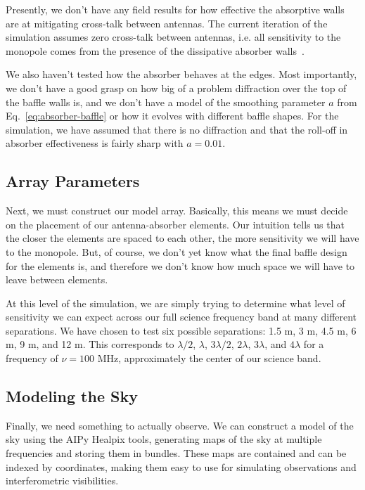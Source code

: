 Presently, we don't have any field results for how effective the absorptive 
walls are at mitigating cross-talk between antennas. The current iteration of 
the simulation assumes zero cross-talk between antennas, i.e. all sensitivity 
to the monopole comes from the presence of the dissipative absorber 
walls~\citep{venumadhav2016}.

We also haven't tested how the absorber behaves at the edges. Most importantly, 
we don't have a good grasp on how big of a problem diffraction over the top of 
the baffle walls is, and we don't have a model of the smoothing parameter $a$ 
from Eq.~\eqref{eq:absorber-baffle} or how it evolves with different baffle 
shapes. For the simulation, we have assumed that there is no diffraction and 
that the roll-off in absorber effectiveness is fairly sharp with $a = 0.01$.

\subsection{Array Parameters}

Next, we must construct our model array. Basically, this means we must decide 
on the placement of our antenna-absorber elements. Our intuition tells us that 
the closer the elements are spaced to each other, the more sensitivity we will 
have to the monopole. But, of course, we don't yet know what the final baffle 
design for the elements is, and therefore we don't know how much space we will 
have to leave between elements.

At this level of the simulation, we are simply trying to determine what level 
of sensitivity we can expect across our full science frequency band at many 
different separations. We have chosen to test six possible separations: 1.5 m, 
3 m, 4.5 m, 6 m, 9 m, and 12 m. This corresponds to $\lambda/2$, $\lambda$, 
  $3\lambda/2$, $2\lambda$, $3\lambda$, and $4\lambda$ for a frequency of $\nu 
  = 100$ MHz, approximately the center of our science band.

\subsection{Modeling the Sky}

Finally, we need something to actually observe. We can construct a model of the 
sky using the AIPy Healpix tools, generating maps of the sky at multiple 
frequencies and storing them in bundles. These maps are contained and can be 
indexed by coordinates, making them easy to use for simulating observations and 
interferometric visibilities.


